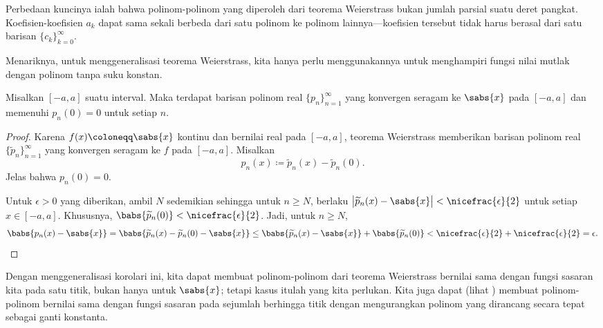 Perbedaan kuncinya ialah bahwa
polinom-polinom yang diperoleh dari teorema Weierstrass bukan jumlah parsial
suatu deret pangkat. Koefisien-koefisien $a_k$ dapat sama sekali berbeda dari
satu polinom ke polinom lainnya---koefisien tersebut tidak harus berasal dari satu barisan
$\{ c_k \}_{k=0}^\infty$.

\medskip

Menariknya, untuk menggeneralisasi teorema Weierstrass, kita hanya perlu
menggunakannya untuk menghampiri fungsi nilai mutlak dengan polinom tanpa
suku konstan.

\begin{cor}
Misalkan $[-a,a]$ suatu interval. Maka terdapat barisan polinom real
$\{ p_n \}_{n=1}^\infty$ yang konvergen seragam ke $\sabs{x}$ pada $[-a,a]$ dan
memenuhi $p_n(0) = 0$ untuk setiap $n$.
\end{cor}

\begin{proof}
Karena $f(x) \coloneqq \sabs{x}$ kontinu dan bernilai real
pada $[-a,a]$, teorema Weierstrass memberikan barisan
polinom real $\{ \widetilde{p}_n \}_{n=1}^\infty$ yang konvergen seragam ke $f$
pada $[-a,a]$. Misalkan
\begin{equation*}
p_n(x) \coloneqq \widetilde{p}_n(x) - \widetilde{p}_n(0) .
\end{equation*}
Jelas bahwa $p_n(0) = 0$.

Untuk $\epsilon > 0$ yang diberikan, ambil $N$ sedemikian sehingga
untuk $n \geq N$, berlaku
$\bigl\lvert\widetilde{p}_n(x)-\sabs{x}\big\rvert <
\nicefrac{\epsilon}{2}$ untuk setiap $x \in [-a,a]$.
Khususnya,
$\babs{\widetilde{p}_n(0)} < \nicefrac{\epsilon}{2}$.
Jadi, untuk $n \geq N$,
\begin{equation*}
\babs{ p_n(x)-\sabs{x} }
=
\babs{ \widetilde{p}_n(x) - \widetilde{p}_n(0) - \sabs{x} }
\leq
\babs{ \widetilde{p}_n(x) - \sabs{x} } + \babs{\widetilde{p}_n(0)} < 
\nicefrac{\epsilon}{2} + \nicefrac{\epsilon}{2} = \epsilon . \qedhere
\end{equation*}
\end{proof}

Dengan menggeneralisasi korolari ini, kita dapat membuat polinom-polinom dari
teorema Weierstrass bernilai sama dengan fungsi sasaran kita pada satu titik,
bukan hanya untuk $\sabs{x}$; tetapi kasus itulah yang kita perlukan. Kita juga
dapat (lihat
)
membuat polinom-polinom bernilai sama dengan fungsi sasaran pada sejumlah
berhingga titik dengan mengurangkan polinom yang dirancang secara tepat sebagai
ganti konstanta.

